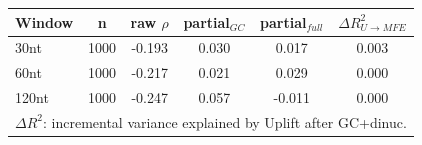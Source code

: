 \begin{center}\small
\begin{tabular}{lccccc}\toprule
Window & n & raw $\rho$ & partial$_{GC}$ & partial$_{full}$ & $\Delta R^2_{U\to MFE}$ \\\midrule
30nt & 1000 & -0.193 & 0.030 & 0.017 & 0.003 \\
60nt & 1000 & -0.217 & 0.021 & 0.029 & 0.000 \\
120nt & 1000 & -0.247 & 0.057 & -0.011 & 0.000 \\
\bottomrule
\multicolumn{6}{l}{\footnotesize $\Delta R^2$: incremental variance explained by Uplift after GC+dinuc.} \\
\end{tabular}
\end{center}
